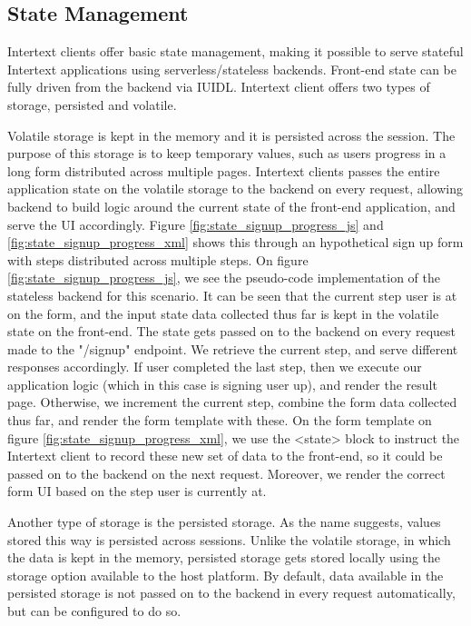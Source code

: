 \subsection{State Management}

Intertext clients offer basic state management, making it possible to serve stateful Intertext applications using serverless/stateless backends. Front-end state can be fully driven from the backend via IUIDL. Intertext client offers two types of storage, persisted and volatile. 

Volatile storage is kept in the memory and it is persisted across the session. The purpose of this storage is to keep temporary values, such as users progress in a long form distributed across multiple pages. Intertext clients passes the entire application state on the volatile storage to the backend on every request, allowing backend to build logic around the current state of the front-end application, and serve the UI accordingly. Figure \ref{fig:state_signup_progress_js} and \ref{fig:state_signup_progress_xml} shows this through an hypothetical sign up form with steps distributed across multiple steps. On figure \ref{fig:state_signup_progress_js}, we see the pseudo-code implementation of the stateless backend for this scenario. It can be seen that the current step user is at on the form, and the input state data collected thus far is kept in the volatile state on the front-end. The state gets passed on to the backend on every request made to the "/signup" endpoint. We retrieve the current step, and serve different responses accordingly. If user completed the last step, then we execute our application logic (which in this case is signing user up), and render the result page. Otherwise, we increment the current step, combine the form data collected thus far, and render the form template with these. On the form template on figure \ref{fig:state_signup_progress_xml}, we use the <state> block to instruct the Intertext client to record these new set of data to the front-end, so it could be passed on to the backend on the next request. Moreover, we render the correct form UI based on the step user is currently at.

Another type of storage is the persisted storage. As the name suggests, values stored this way is persisted across sessions. Unlike the volatile storage, in which the data is kept in the memory, persisted storage gets stored locally using the storage option available to the host platform. By default, data available in the persisted storage is not passed on to the backend in every request automatically, but can be configured to do so.

